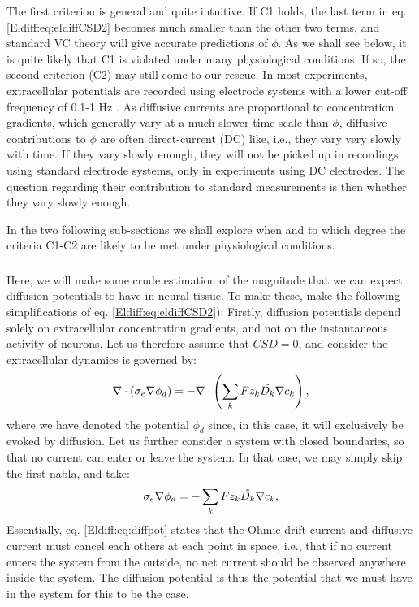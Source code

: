 The first criterion is general and quite intuitive. If C1 holds, the last term in eq. \ref{Eldiff:eq:eldiffCSD2} becomes much smaller than the other two terms, and standard VC theory will give accurate predictions of $\phi$. As we shall see below, it is quite likely that C1 is violated under many physiological conditions. If so, the second criterion (C2) may still come to our rescue. In most experiments, extracellular potentials are recorded using electrode systems with a lower cut-off frequency of 0.1-1 Hz \cite{Einevoll2007}. As diffusive currents are proportional to concentration gradients, which generally vary at a much slower time scale than $\phi$, diffusive contributions to $\phi$ are often direct-current (DC) like, i.e., they vary very slowly with time. If they vary slowly enough, they will not be picked up in recordings using standard electrode systems, only in experiments using DC electrodes. The question regarding their contribution to standard measurements is then whether they vary slowly enough. 

In the two following sub-sections we shall explore when and to which degree the criteria C1-C2 are likely to be met under physiological conditions.

\subsubsection{}
Here, we will make some crude estimation of the magnitude that we can expect diffusion potentials to have in neural tissue. To make these, make the following simplifications of eq. \ref{Eldiff:eq:eldiffCSD2}): Firstly, diffusion potentials depend solely on extracellular concentration gradients, and not on the instantaneous activity of neurons. Let us therefore assume that $CSD = 0$, and consider the extracellular dynamics is governed by:
\begin{equation}
\nabla \cdot (\sigma_e\nabla\phi_d) = - \nabla \cdot \left (\sum_k{F z_k \tilde{D_k}{\bf \nabla} c_{k}} \right), 
\label{Eldiff:eq:eldiffCSD3}
\end{equation}
where we have denoted the potential $\phi_d$ since, in this case, it will exclusively be evoked by diffusion. Let us further consider a system with closed boundaries, so that no current can enter or leave the system. In that case, we may simply skip the first nabla, and take:
\begin{equation}
\sigma_e\nabla\phi_d = -\sum_k{F z_k \tilde{D_k}{\bf \nabla} c_{k}}, 
\label{Eldiff:eq:diffpot}
\end{equation}
Essentially, eq. \ref{Eldiff:eq:diffpot} states that the Ohmic drift current and diffusive current must cancel each others at each point in space, i.e., that if no current enters the system from the outside, no net current should be observed anywhere inside the system. The diffusion potential is thus the potential that we must have in the system for this to be the case. 

